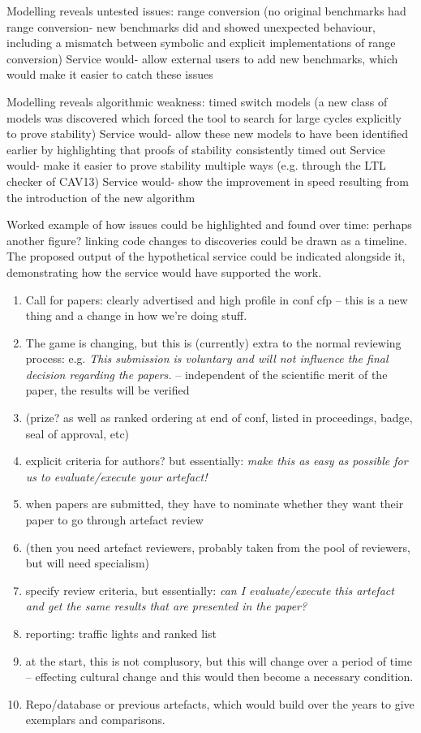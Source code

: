\documentclass{llncs}
\begin{document}
Modelling reveals untested issues: range conversion
(no original benchmarks had range conversion- new benchmarks did
and showed unexpected behaviour, including a mismatch between symbolic
and explicit implementations of range conversion)
Service would- allow external users to add new benchmarks, which would make it
easier to catch these issues

Modelling reveals algorithmic weakness: timed switch models 
(a new class of models was discovered which forced the tool to search 
for large cycles explicitly to prove stability)
Service would- allow these new models to have been identified earlier
by highlighting that proofs of stability consistently timed out
Service would- make it easier to prove stability multiple ways (e.g.
through the LTL checker of CAV13)
Service would- show the improvement in speed resulting from the introduction
of the new algorithm

Worked example of how issues could be highlighted and found over time: perhaps
another figure? linking code changes to discoveries could be drawn as a timeline. The 
proposed output of the hypothetical service could be indicated alongside it, 
demonstrating how the service would have supported the work.

\begin{enumerate}
\item Call for papers: clearly advertised and high profile in conf cfp
  -- this is a new thing and a change in how we're doing stuff.
\item The game is changing, but this is (currently) extra to the
  normal reviewing process: 
e.g. {\emph{This submission is voluntary and will not influence the final decision
regarding the papers.}} -- independent of the scientific merit of the
paper, the results will be verified 
\item (prize? as well as ranked ordering at end of conf, listed in
  proceedings, badge, seal of approval, etc)
\item explicit criteria for authors? but essentially: {\emph{make this
      as easy as possible for us to evaluate/execute your artefact!}}
\item when papers are submitted, they have to nominate whether they
  want their paper to go through artefact review
\item (then you need artefact reviewers, probably taken from the pool of
  reviewers, but will need specialism)
\item specify review criteria, but essentially: {\emph{can I evaluate/execute this
  artefact and get the same results that are presented in the paper?}}
\item reporting: traffic lights and ranked list
\item at the start, this is not complusory, but this will change over a period of
time -- effecting cultural change and this would then become a
necessary condition.
\item Repo/database or previous artefacts, which would build over the
  years to give exemplars and comparisons.
\end{enumerate}
\end{document}
